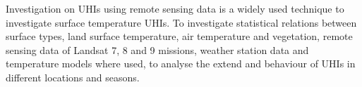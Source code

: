 Investigation on \acfp{UHI} using remote sensing data is a widely used technique to investigate surface temperature \acp{UHI}. 
To investigate statistical relations between surface types, land surface temperature, air temperature and vegetation, remote sensing data of Landsat 7, 8 and 9 missions, weather station data and temperature models where used, to analyse the extend and behaviour of \acp{UHI} in different locations and seasons. 

